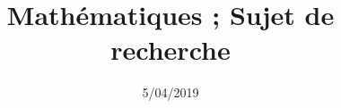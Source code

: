 \documentclass[a4paper,french,12pt]{article}
\title{Mathématiques ; Sujet de recherche}
\date{5/04/2019}
\author{}
\begin{document}
\newcommand{\newDef}[1]{\stepcounter{def} \textbf{\underline{Définition n$^{\underline{o}} \thedef$ :}} \emph{#1}}
\newcommand{\newprop}[1]{\stepcounter{prop} \textbf{\underline{Propriété n$^{\underline{o}} \theprop$ :}} \emph{#1}}
\newcommand{\newcoro}[1]{\stepcounter{coro} \textbf{\underline{Corollaire n$^{\underline{o}} \thecoro$ :}} \emph{#1}}
\newcommand{\newconj}[1]{\stepcounter{conj} \textbf{\underline{Conjecture n$^{\underline{o}} \theconj$ :}} \emph{#1}}
\newcommand{\newlemme}[1]{\stepcounter{lemme} \textbf{\underline{Lemme n$^{\underline{o}} \thelemme$ :}} \emph{#1}}

\newcommand{\newPreuve}[1]{\emph{\underline{Preuve :}} #1}
\renewcommand*{\abstract}{\footnotesize\textbf{\emph{\underline{Résumé}}. ---}\scriptsize}
\renewcommand*{\contentsname}{\footnotesize\textbf{Table des matières}\scriptsize}

\renewcommand*{\labelitemi}{--}
\renewcommand*{\labelitemii}{$\bullet$}
\renewcommand*{\labelenumi}{{\textbf{\arabic{enumi})}}}%
\renewcommand*{\labelenumii}{{\alph{enumii})}}
\newcommand{\claim}{\hfill\square}

\end{document}
